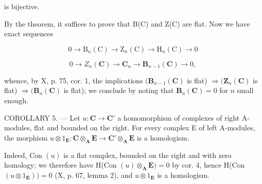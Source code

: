is bijective.

By the theorem, it suffices to prove that B(C) and Z(C) are flat. Now we have exact sequences

\[
0 \to \mathrm{B} _ {n} (\mathrm{C}) \to \mathrm{Z} _ {n} (\mathrm{C}) \to \mathrm{H} _ {n} (\mathrm{C}) \to 0
\]

\[
0 \to Z _ {n} (\mathbf {C}) \to \mathbf {C} _ {n} \to \mathbf {B} _ {n - 1} (\mathbf {C}) \to 0,
\]

whence, by X, p. 75, cor. 1, the implications \((\mathbf{B}_{n-1}(\mathbf{C})\) is flat) \(\Rightarrow (\mathbf{Z}_n(\mathbf{C})\) is flat) \(\Rightarrow (\mathbf{B}_n(\mathbf{C})\) is flat); we conclude by noting that \(\mathbf{B}_n(\mathbf{C}) = 0\) for \(n\) small enough.

COROLLARY 5. --- Let \(u: \mathbf{C} \to \mathbf{C}'\) a homomorphism of complexes of right A-modules, flat and bounded on the right. For every complex E of left A-modules, the morphism \(u \otimes 1_{\mathbf{E}}: \mathbf{C} \otimes_{\mathbf{A}} \mathbf{E} \to \mathbf{C}' \otimes_{\mathbf{A}} \mathbf{E}\) is a homologism.

Indeed, Con \((u)\) is a flat complex, bounded on the right and with zero homology; we therefore have H(Con \((u) \otimes_{\mathbf{A}} \mathbf{E}) = 0\) by cor. 4, hence H(Con \((u \otimes 1_{\mathbf{E}})) = 0\) (X, p. 67, lemma 2), and \(u \otimes 1_{\mathbf{E}}\) is a homologism.


